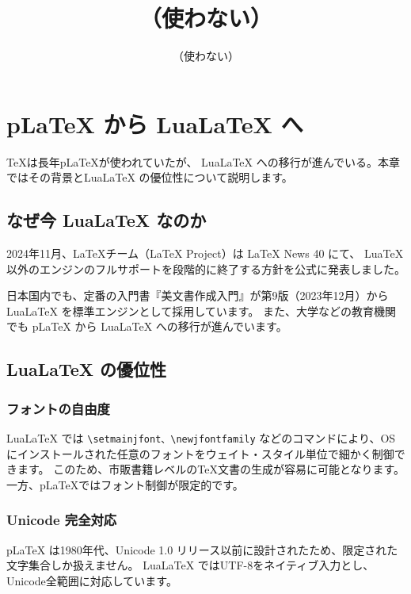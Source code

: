 \documentclass[10pt]{book}
\title{（使わない）}
\author{（使わない）}
\date{}%
\begin{document}

\frontmatter
\tableofcontents
\mainmatter

\newpage
\chapter{pLaTeX から LuaLaTeX へ}
\label{chap:architecture-basics}
TeXは長年pLaTeXが使われていたが、 LuaLaTeX への移行が進んでいる。本章ではその背景とLuaLaTeX の優位性について説明します。


\newpage
\section{なぜ今 LuaLaTeX なのか}

2024年11月、LaTeXチーム（LaTeX Project）は LaTeX News 40 にて、
LuaTeX 以外のエンジンのフルサポートを段階的に終了する方針を公式に発表しました。

日本国内でも、定番の入門書『美文書作成入門』が第9版（2023年12月）から LuaLaTeX を標準エンジンとして採用しています。
また、大学などの教育機関でも pLaTeX から LuaLaTeX への移行が進んでいます。

\section{LuaLaTeX の優位性}
\subsection{フォントの自由度}

LuaLaTeX では \verb|\setmainjfont、\newjfontfamily| などのコマンドにより、OS にインストールされた任意のフォントをウェイト・スタイル単位で細かく制御できます。
このため、市販書籍レベルのTeX文書の生成が容易に可能となります。
一方、pLaTeXではフォント制御が限定的です。

\vspace{5mm}
\subsection{Unicode 完全対応}
pLaTeX は1980年代、Unicode 1.0 リリース以前に設計されたため、限定された文字集合しか扱えません。
LuaLaTeX ではUTF-8をネイティブ入力とし、Unicode全範囲に対応しています。
\end{document}

